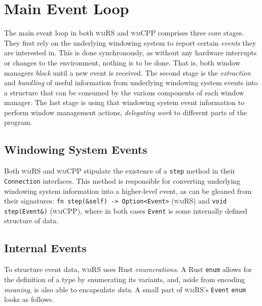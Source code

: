 \section{Main Event Loop}

The main  event loop  in both \textsc{wmRS}  and \textsc{wmCPP}  comprises three
core  stages. They  first  rely on  the underlying  windowing  system to  report
certain \textit{events} they  are interested in. This is  done synchronously, as
without any hardware interrupts or changes  to the environment, nothing is to be
done.  That  is, both  window  managers  \textit{block}  until  a new  event  is
received. The second  stage is the \textit{extraction}  and \textit{bundling} of
useful information from underlying windowing system events into a structure that
can be consumed by the various components of each window manager. The last stage
is using  that windowing system  event information to perform  window management
actions, \textit{delegating work} to different parts of the program.

\subsection{Windowing System Events}

Both \textsc{wmRS} and \textsc{wmCPP} stipulate the existence of a \texttt{step}
method in their  \texttt{Connection} interfaces. This method  is responsible for
converting underlying  windowing system  information into a  higher-level event,
as  can  be  gleaned  from their  signatures:  \texttt{fn  step(&self)
->  Option<Event>}   (\textsc{wmRS})  and   \texttt{void  step(Event&)}
(\textsc{wmCPP}), where in both cases  \texttt{Event} is some internally defined
structure of data.

\subsection{Internal Events}



To structure event  data, \textsc{wmRS} uses Rust  \textit{enumerations}. A Rust
\texttt{enum}  allows for  the  definition of  a  type by  enumerating
its  variants,  and, aside  from  encoding  \textit{meaning},  is also  able  to
encapsulate  \textit{data}\cite{therustbook}. A  small  part of  \textsc{wmRS}'s
\texttt{Event} \texttt{enum} looks as follows.

